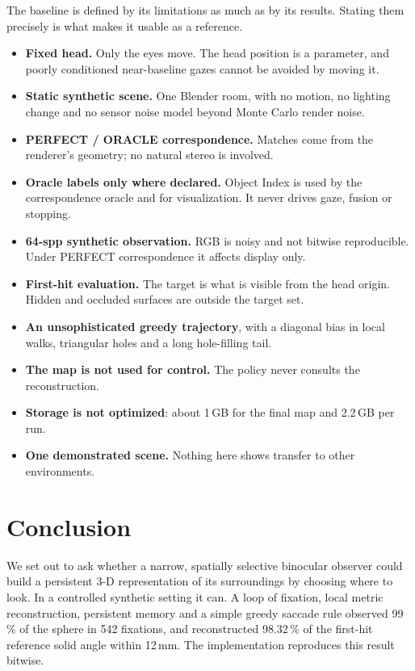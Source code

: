 \documentclass[11pt,a4paper]{article}
\newcommand{\pct}[1]{#1\,\%}
\begin{document}
The baseline is defined by its limitations as much as by its results. Stating them precisely is what makes it usable
as a reference.
\begin{itemize}
  \item \textbf{Fixed head.} Only the eyes move. The head position is a parameter, and poorly conditioned
        near-baseline gazes cannot be avoided by moving it.
  \item \textbf{Static synthetic scene.} One Blender room, with no motion, no lighting change and no sensor noise
        model beyond Monte Carlo render noise.
  \item \textbf{PERFECT / ORACLE correspondence.} Matches come from the renderer's geometry; no natural stereo is
        involved.
  \item \textbf{Oracle labels only where declared.} Object Index is used by the correspondence oracle and for
        visualization. It never drives gaze, fusion or stopping.
  \item \textbf{64-spp synthetic observation.} RGB is noisy and not bitwise reproducible. Under PERFECT correspondence
        it affects display only.
  \item \textbf{First-hit evaluation.} The target is what is visible from the head origin. Hidden and occluded
        surfaces are outside the target set.
  \item \textbf{An unsophisticated greedy trajectory}, with a diagonal bias in local walks, triangular holes and a long
        hole-filling tail.
  \item \textbf{The map is not used for control.} The policy never consults the reconstruction.
  \item \textbf{Storage is not optimized}: about 1\,GB for the final map and 2.2\,GB per run.
  \item \textbf{One demonstrated scene.} Nothing here shows transfer to other environments.
\end{itemize}

\section{Conclusion}\label{sec:conclusion}

We set out to ask whether a narrow, spatially selective binocular observer could build a persistent 3-D
representation of its surroundings by choosing where to look. In a controlled synthetic setting it can. A loop of
fixation, local metric reconstruction, persistent memory and a simple greedy saccade rule observed \pct{99} of the
sphere in 542 fixations, and reconstructed \pct{98.32} of the first-hit reference solid angle within 12\,mm. The
implementation reproduces this result bitwise.
\end{document}
